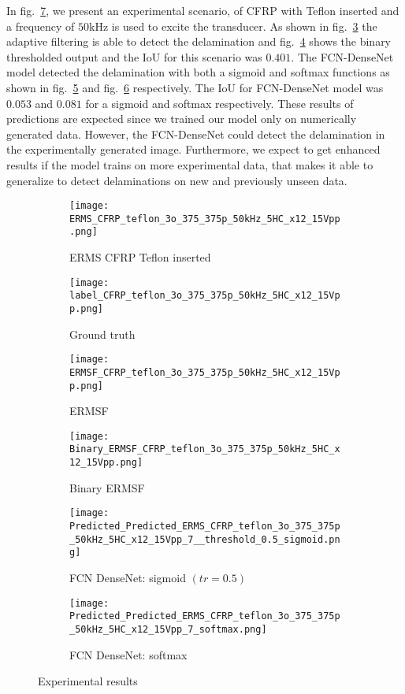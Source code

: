 	In fig.~\ref{fig:Exp_ERMS_teflon}, we present an experimental scenario, of CFRP with Teflon inserted and a frequency of \(50\)kHz is used to excite the transducer.
	As shown in fig.~\ref{fig:ERMSF_CFRP_teflon} the adaptive filtering is able to detect the delamination and fig.~\ref{fig:Binary_ERMSF_CFRP} shows the binary thresholded output and the IoU for this scenario was \(0.401\). 
	The FCN-DenseNet model detected the delamination with both a sigmoid and softmax functions as shown in fig.~\ref{fig:EXP_predict_sigmoid} and fig.~\ref{fig:EXP_predict_softmax} respectively.
	The IoU for FCN-DenseNet model was \(0.053\) and \(0.081\) for a sigmoid and softmax respectively.
	These results of predictions are expected since we trained our model only on numerically generated data.
	However, the FCN-DenseNet could detect the delamination in the experimentally generated image.
	Furthermore, we expect to get enhanced results if the model trains on more experimental data, that makes it able to generalize to detect delaminations on new and previously unseen data. 
	\begin{figure} [!h]
		\centering
		\begin{subfigure}[b]{0.47\textwidth}
			\centering
			\texttt{[image: ERMS\_CFRP\_teflon\_3o\_375\_375p\_50kHz\_5HC\_x12\_15Vpp.png]}
			\caption{ERMS CFRP Teflon inserted}
			\label{fig:Delamination}
		\end{subfigure}			
		\hfill
		\begin{subfigure}[b]{0.47\textwidth}
			\centering 	
			\texttt{[image: label\_CFRP\_teflon\_3o\_375\_375p\_50kHz\_5HC\_x12\_15Vpp.png]}
			\caption{Ground truth} 
			\label{fig:damage_label}
		\end{subfigure}
		\hfill
		\begin{subfigure}[b]{0.47\textwidth}
			\centering
			\texttt{[image: ERMSF\_CFRP\_teflon\_3o\_375\_375p\_50kHz\_5HC\_x12\_15Vpp.png]}
			\caption{ERMSF} 
			\label{fig:ERMSF_CFRP_teflon}
		\end{subfigure}
		\hfill
		\begin{subfigure}[b]{0.47\textwidth}
		\centering
		\texttt{[image: Binary\_ERMSF\_CFRP\_teflon\_3o\_375\_375p\_50kHz\_5HC\_x12\_15Vpp.png]}
		\caption{Binary ERMSF} 
		\label{fig:Binary_ERMSF_CFRP}
		\end{subfigure}
		\hfill
		\begin{subfigure}[b]{0.47\textwidth}
			\centering
			\texttt{[image: Predicted\_Predicted\_ERMS\_CFRP\_teflon\_3o\_375\_375p\_50kHz\_5HC\_x12\_15Vpp\_7\_\_threshold\_0.5\_sigmoid.png]}
			\caption{FCN DenseNet: sigmoid \((tr = 0.5)\)} 
			\label{fig:EXP_predict_sigmoid}
		\end{subfigure}
		\hfill
		\begin{subfigure}[b]{0.47\textwidth}
			\centering
			\texttt{[image: Predicted\_Predicted\_ERMS\_CFRP\_teflon\_3o\_375\_375p\_50kHz\_5HC\_x12\_15Vpp\_7\_softmax.png]}
			\caption{FCN DenseNet: softmax} 
			\label{fig:EXP_predict_softmax}
		\end{subfigure}
			\caption{Experimental results}
			\label{fig:Exp_ERMS_teflon}
		\end{figure}
\clearpage
	
